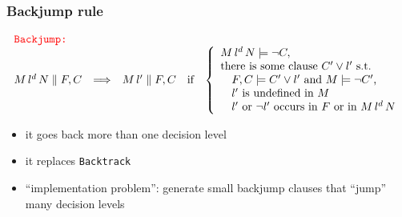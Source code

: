 \documentclass[smaller]{beamer}
\newcommand{\state}[2]{{#1\parallel #2}}
\newcommand{\red}[1]{\textcolor{red}{#1}}
\begin{document}
\begin{frame}
\frametitle{Backjump rule}
\small
\[
\begin{array}{lclcl}
\red{\mbox{\tt Backjump:}} \\
\state{M\, l^d\, N}{F,C}&\Longrightarrow& \state{M\,l'}{F,C} &\mbox{if} &\left\{\begin{array}{l}
												      M\, l^d\, N\models \neg C,\\
												      \mbox{there is some clause $C'\vee l'$ s.t.} \\
												\ \ \ \mbox{$F,C\models C'\vee l'$ and $M\models \neg C'$,}\\    	 											   \ \ \ \mbox{$l'$ is undefined in $M$}\\   				
											\ \ \  \mbox{$l'$ or $\neg l'$ occurs in $F$ or in $M\, l^d\, N$}								      				           \end{array}\right. \\[2mm]
\end{array}
\]
\begin{itemize}
\item it goes back more than one decision level
\item it replaces {\tt Backtrack}
\item ``implementation problem'': generate small backjump clauses that ``jump'' many decision levels
\end{itemize}
\end{frame}
\end{document}
